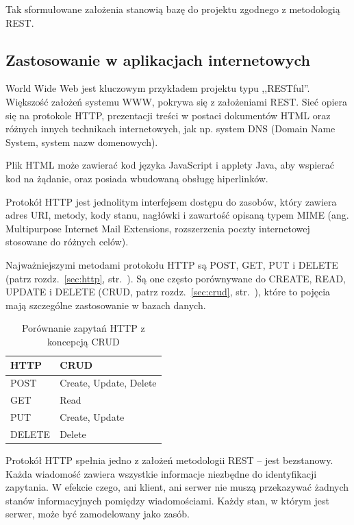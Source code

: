 \documentclass[a4paper,12pt,oneside]{report}
\begin{document}
Tak sformułowane założenia stanowią bazę do projektu zgodnego z metodologią REST.
\subsection{Zastosowanie w aplikacjach internetowych}
\label{rest:web}

World Wide Web jest kluczowym przykładem projektu typu ,,RESTful''. Większość założeń systemu WWW, pokrywa się z założeniami REST. Sieć opiera się na protokole HTTP, prezentacji treści w postaci dokumentów HTML oraz różnych innych technikach internetowych, jak np. system DNS (Domain Name System, system nazw domenowych).

Plik HTML może zawierać kod języka JavaScript i applety Java, aby wspierać kod na żądanie, oraz posiada wbudowaną obsługę hiperlinków.

Protokół HTTP jest jednolitym interfejsem dostępu do zasobów, który zawiera adres URI, metody, kody stanu, nagłówki i zawartość opisaną typem MIME (ang. Multipurpose Internet Mail Extensions, rozszerzenia poczty internetowej stosowane do różnych celów).

Najważniejszymi metodami protokołu HTTP są POST, GET, PUT i DELETE (patrz rozdz.~\ref{sec:http}, str.~\pageref{sec:http}). Są one często porównywane do CREATE, READ, UPDATE i DELETE (CRUD, patrz rozdz.~\ref{sec:crud}, str.~\pageref{sec:crud}), które to pojęcia mają szczególne zastosowanie w bazach danych.

\begin{table}[h]
  \centering
    \begin{tabular}{|l|l|}\hline
    HTTP   & CRUD \\\hline
    POST   & Create, Update, Delete \\
    GET    & Read \\
    PUT    & Create, Update \\
    DELETE & Delete \\\hline
    \end{tabular}
  \caption{Porównanie zapytań HTTP z koncepcją CRUD\label{rest:crud}}
\end{table}

Protokół HTTP spełnia jedno z założeń metodologii REST -- jest bezstanowy. Każda wiadomość zawiera wszystkie informacje niezbędne do identyfikacji zapytania. W efekcie czego, ani klient, ani serwer nie muszą przekazywać żadnych stanów informacyjnych pomiędzy wiadomościami. Każdy stan, w którym jest serwer, może być zamodelowany jako zasób.
\end{document}
